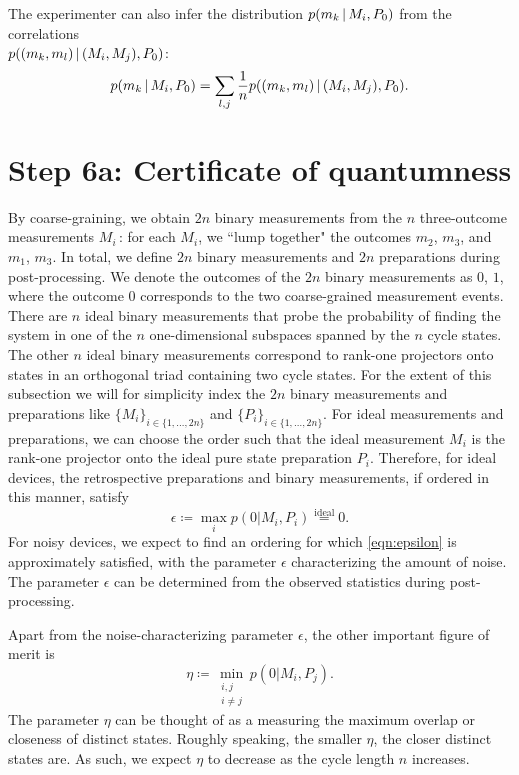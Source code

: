 The experimenter can also infer the distribution $p(m_k\thinspace\vert\thinspace M_i, P_0)$ from the correlations \\$p((m_k,m_l)\thinspace\vert\thinspace(M_i,M_j),P_0)$:
\begin{equation*}
p(m_k \thinspace\vert\thinspace M_i, P_0)=\sum_{l,j}\frac{1}{n}p((m_k,m_l)\thinspace\vert\thinspace (M_i,M_j),P_0).
\end{equation*}

\section{Step 6a: Certificate of quantumness}
\label{sec:certifyquant}
By coarse-graining, we obtain $2n$ binary measurements from the $n$ three-outcome measurements $M_i$\,: for each $M_i$, we ``lump together" the outcomes $m_2$, $m_3$, and $m_1$, $m_3$. In total, we define $2n$ binary measurements and $2n$ preparations during post-processing. We denote the outcomes of the $2n$ binary measurements as $0$, $1$, where the outcome $0$ corresponds to the two coarse-grained measurement events. There are $n$ ideal binary measurements that probe the probability of finding the system in one of the $n$ one-dimensional subspaces spanned by the $n$ cycle states. The other $n$ ideal binary measurements correspond to rank-one projectors onto states in an orthogonal triad containing two cycle states. For the extent of this subsection we will for simplicity index the $2n$ binary measurements and preparations like $\{M_i\}_{i\in\{1,\dots,2n\}}$ and $\{P_i\}_{i\in\{1,\dots,2n\}}$. For ideal measurements and preparations, we can choose the order such that the ideal measurement $M_i$ is the rank-one projector onto the ideal pure state preparation $P_i$. Therefore, for ideal devices, the retrospective preparations and binary measurements, if ordered in this manner, satisfy \begin{equation}
\label{eqn:epsilon}
\epsilon \coloneqq \max_i p(0\vert M_i, P_i)\stackrel{\text{ideal}}{=}0.
\end{equation} 
For noisy devices, we expect to find an ordering for which \ref{eqn:epsilon} is approximately satisfied, with the parameter $\epsilon$ characterizing the amount of noise. The parameter $\epsilon$ can be determined from the observed statistics during post-processing.

Apart from the noise-characterizing parameter $\epsilon$, the other important figure of merit is
\begin{equation*}
\eta\coloneqq \min_{\substack{i,j \\ i\neq j}} p(0\vert M_i, P_j).
\end{equation*}
The parameter $\eta$ can be thought of as a measuring the maximum overlap or closeness of distinct states. Roughly speaking, the smaller $\eta$, the closer distinct states are. As such, we expect $\eta$ to decrease as the cycle length $n$ increases. 

